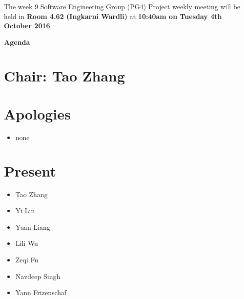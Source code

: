 \documentclass[11pt, a4paper]{article}
\begin{document}

\noindent The week 9 Software Engineering Group (PG4) Project weekly meeting will be held in {\bf Room 4.62 (Ingkarni Wardli)} at {\bf 10:40am on Tuesday 4th October 2016}.



\vspace*{15pt}

\begin{center}

\huge \bf Agenda

\end{center}




\section*{Chair: Tao Zhang}

\vspace*{10pt}




\section{Apologies}

\begin{itemize}

\item none

\end{itemize}




\section{Present}

\begin{itemize}

\item Tao Zhang

\item Yi Lin

\item Yuan Liang

\item Lili Wu

\item Zeqi Fu

\item Navdeep Singh

\item Yann Frizenschaf

\end{itemize}
\end{document}
